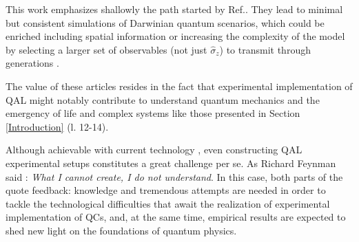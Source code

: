 \documentclass[11pt]{article}
\numberwithin{equation}{section} %
\numberwithin{figure}{section} %
\begin{document}
This work emphasizes shallowly the path started by Ref.\cite{QAL_IBM}\cite{AL_in_QT}\cite{Bio_Cloning}.  They lead to minimal but consistent simulations of Darwinian quantum scenarios, which could be enriched including spatial information or increasing the complexity of the model by selecting a larger set of observables (not just $\hat{\sigma}_z$) to transmit through generations \cite[p.~2, l.~30-33]{QAL_IBM}.

 The value of these articles resides in the fact that experimental implementation of QAL might notably contribute to understand quantum mechanics and the emergency of life and complex systems like those presented in Section \ref{Introduction} (l. 12-14). 

Although achievable with current technology \cite[p.~1, l.~6-7]{Bio_Cloning}, even constructing QAL experimental setups 
constitutes a great challenge per se. As Richard Feynman said \cite[p.~69, l.~30-31]{Ricard_Sole}: \emph{What I cannot create, I do not understand}. In this case, both parts of the quote feedback: knowledge and tremendous attempts are needed in order to tackle the technological difficulties that await the realization of experimental implementation of QCs, and, at the same time, empirical results are expected to shed new light on the foundations of quantum physics.


\newpage
\end{document}
